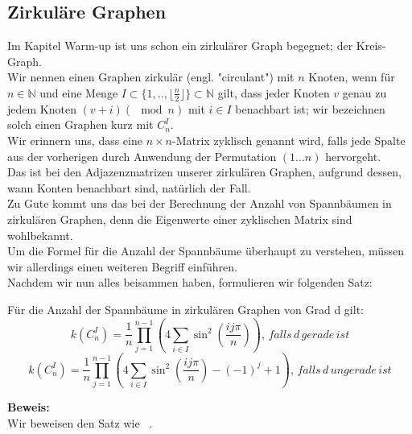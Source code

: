 \subsection{Zirkuläre Graphen}
Im Kapitel Warm-up ist uns schon ein zirkulärer Graph begegnet; der Kreis-Graph.\\
Wir nennen einen Graphen zirkulär (engl. "circulant") mit $n$ Knoten, wenn für $n \in \mathbb{N}$ und eine Menge $I \subset{\{1,..,\lfloor \frac{n}{2} \rfloor \}}\subset{\mathbb{N}}$ gilt, dass jeder Knoten $v$ genau zu jedem Knoten $(v+i) (\mod{n})$ mit $i \in I$ benachbart ist; wir bezeichnen solch einen Graphen kurz mit $C_n^I$.\\
Wir erinnern uns, dass eine $n\times n$-Matrix zyklisch genannt wird, falls jede Spalte aus der vorherigen durch Anwendung der Permutation $(1...n)$ hervorgeht.\\
Das ist bei den Adjazenzmatrizen unserer zirkulären Graphen, aufgrund dessen, wann Konten benachbart sind, natürlich der Fall.\\
Zu Gute kommt uns das bei der Berechnung der Anzahl von Spannbäumen in zirkulären Graphen, denn die Eigenwerte einer zyklischen Matrix sind wohlbekannt.\\
Um die Formel für die Anzahl der Spannbäume überhaupt zu verstehen, müssen wir allerdings einen weiteren Begriff einführen. \\
Nachdem wir nun alles beisammen haben, formulieren wir folgenden Satz:
\begin{Tms}
Für die Anzahl der Spannbäume in zirkulären Graphen von Grad d gilt:\\
\begin{equation}
\mathit{k}\left( C_n^I \right) = \frac{1}{n} \prod_{j=1}^{n-1} \left(4 \sum_{i \in I} \sin^2 \left( \frac{ij\pi}{n}\right) \right),\,falls\,d\,gerade\,ist
\end{equation}
\begin{equation}
\mathit{k}\left( C_n^I \right) = \frac{1}{n} \prod_{j=1}^{n-1} \left(4 \sum_{i \in I} \sin^2 \left( \frac{ij\pi}{n}\right)-(-1)^j+1\right),\,falls\,d\,ungerade\,ist
\end{equation}
\end{Tms}
\textbf{Beweis:}\\
Wir beweisen den Satz wie ~\cite{wang_yang_1984}.\\
\begin{Bsps}
\end{Bsps} 
